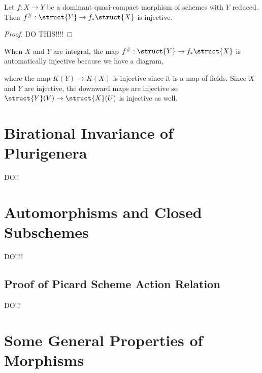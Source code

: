\documentclass[12pt]{article}
\begin{document}
\begin{lemma}
Let $f : X \to Y$ be a dominant quasi-compact morphism of schemes with $Y$ reduced. Then $f^{\#} : \struct{Y} \to f_* \struct{X}$ is injective.
\end{lemma}

\begin{proof}
DO THIS!!!!
\end{proof}

\begin{rmk}
When $X$ and $Y$ are integral, the map $f^{\#} : \struct{Y} \to f_* \struct{X}$ is automatically injective because we have a diagram,
\begin{center}
\end{center}
where the map $K(Y) \to K(X)$ is injective since it is a map of fields. Since $X$ and $Y$ are injective, the downward maps are injective so $\struct{Y}(V) \to \struct{X}(U)$ is injective as well.
\end{rmk}

\begin{prop}

\end{prop}

\section{Birational Invariance of Plurigenera}

\begin{prop}
DO!!
\end{prop}

\section{Automorphisms and Closed Subschemes}
DO!!!!
\subsection{Proof of Picard Scheme Action Relation}

DO!!!

\section{Some General Properties of Morphisms}
\end{document}
